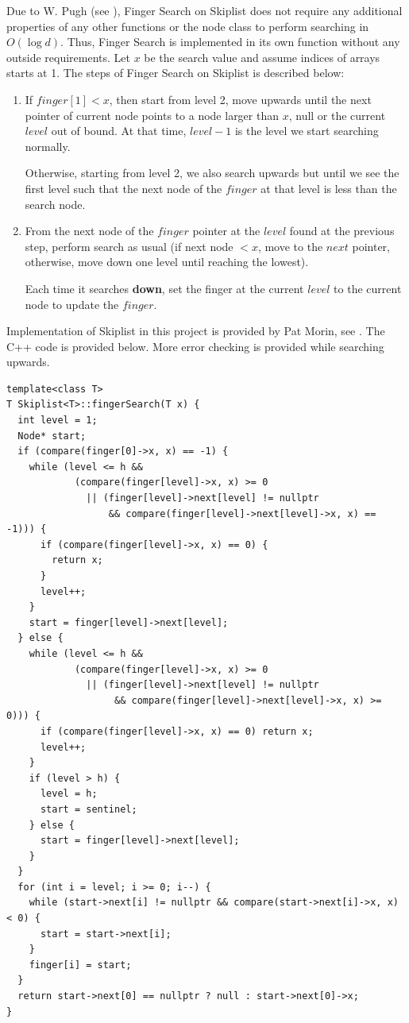 \documentclass[12pt,english,]{article}
\begin{document}
Due to W. Pugh (see \cite{2}), Finger Search on Skiplist does not
require any additional properties of any other functions or the node
class to perform searching in \(O(\log d)\). Thus, Finger Search is
implemented in its own function without any outside requirements. Let
\(x\) be the search value and assume indices of arrays starts at 1. The
steps of Finger Search on Skiplist is described below:

\begin{enumerate}
\def\labelenumi{\arabic{enumi}.}
\item
  If \(finger[1] < x\), then start from level 2, move upwards until the
  next pointer of current node points to a node larger than \(x\), null
  or the current \(level\) out of bound. At that time, \(level -1\) is
  the level we start searching normally.

  Otherwise, starting from level 2, we also search upwards but until we
  see the first level such that the next node of the \(finger\) at that
  level is less than the search node.
\item
  From the next node of the \(finger\) pointer at the \(level\) found at
  the previous step, perform search as usual (if next node \(< x\), move
  to the \(next\) pointer, otherwise, move down one level until reaching
  the lowest).

  Each time it searches \textbf{down}, set the finger at the current
  \(level\) to the current node to update the \(finger\).
\end{enumerate}

Implementation of Skiplist in this project is provided by Pat Morin, see
\cite{2}. The C++ code is provided below. More error checking is
provided while searching upwards.

\begin{lstlisting}
template<class T>
T Skiplist<T>::fingerSearch(T x) {
  int level = 1;
  Node* start;
  if (compare(finger[0]->x, x) == -1) {
    while (level <= h &&
            (compare(finger[level]->x, x) >= 0
              || (finger[level]->next[level] != nullptr
                  && compare(finger[level]->next[level]->x, x) == -1))) {
      if (compare(finger[level]->x, x) == 0) {
        return x;
      }
      level++;
    }
    start = finger[level]->next[level];
  } else {
    while (level <= h &&
            (compare(finger[level]->x, x) >= 0
              || (finger[level]->next[level] != nullptr
                   && compare(finger[level]->next[level]->x, x) >= 0))) {
      if (compare(finger[level]->x, x) == 0) return x;
      level++;
    }
    if (level > h) {
      level = h;
      start = sentinel;
    } else {
      start = finger[level]->next[level];
    }
  }
  for (int i = level; i >= 0; i--) {
    while (start->next[i] != nullptr && compare(start->next[i]->x, x) < 0) {
      start = start->next[i];
    }
    finger[i] = start;
  }
  return start->next[0] == nullptr ? null : start->next[0]->x;
}
\end{lstlisting}
\end{document}
